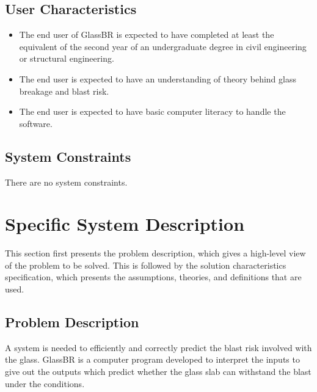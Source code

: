 \documentclass[12pt]{article}
\begin{document}
\subsection{User Characteristics}
\label{Sec:UserChars}
\begin{itemize}
\item{The end user of GlassBR is expected to have completed at least the equivalent of the second year of an undergraduate degree in civil engineering or structural engineering.}
\item{The end user is expected to have an understanding of theory behind glass breakage and blast risk.}
\item{The end user is expected to have basic computer literacy to handle the software.}
\end{itemize}
\subsection{System Constraints}
\label{Sec:SysConstraints}
There are no system constraints.
\section{Specific System Description}
\label{Sec:SpecSystDesc}
This section first presents the problem description, which gives a high-level view of the problem to be solved. This is followed by the solution characteristics specification, which presents the assumptions, theories, and definitions that are used.
\subsection{Problem Description}
\label{Sec:ProbDesc}
A system is needed to efficiently and correctly predict the blast risk involved with the glass. GlassBR is a computer program developed to interpret the inputs to give out the outputs which predict whether the glass slab can withstand the blast under the conditions.
\end{document}

